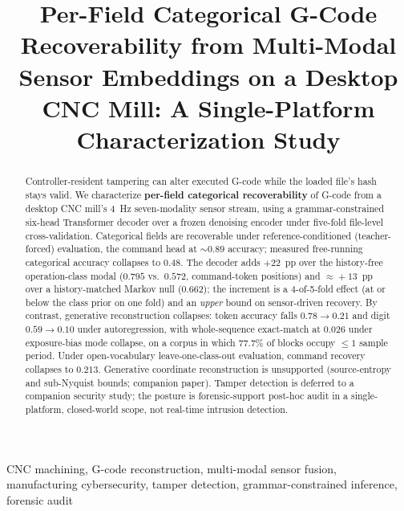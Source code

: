 \documentclass[conference]{IEEEtran}
\begin{document}
\title{Per-Field Categorical G-Code Recoverability from Multi-Modal Sensor Embeddings on a Desktop CNC Mill: A Single-Platform Characterization Study}

\author{%
}

\maketitle

\begin{abstract}
Controller-resident tampering can alter executed G-code while the loaded file's hash stays valid. We characterize \textbf{per-field categorical recoverability} of G-code from a desktop CNC mill's 4~Hz seven-modality sensor stream, using a grammar-constrained six-head Transformer decoder over a frozen denoising encoder under five-fold file-level cross-validation. Categorical fields are recoverable under reference-conditioned (teacher-forced) evaluation, the command head at $\sim\!0.89$ accuracy; measured free-running categorical accuracy collapses to $0.48$. The decoder adds $+22$~pp over the history-free operation-class modal ($0.795$ vs.\ $0.572$, command-token positions) and $\approx\!+13$~pp over a history-matched Markov null ($0.662$); the increment is a 4-of-5-fold effect (at or below the class prior on one fold) and an \emph{upper} bound on sensor-driven recovery. By contrast, generative reconstruction collapses: token accuracy falls $0.78\!\to\!0.21$ and digit $0.59\!\to\!0.10$ under autoregression, with whole-sequence exact-match at $0.026$ under exposure-bias mode collapse, on a corpus in which $77.7\%$ of blocks occupy $\le\!1$ sample period. Under open-vocabulary leave-one-class-out evaluation, command recovery collapses to $0.213$. Generative coordinate reconstruction is unsupported (source-entropy and sub-Nyquist bounds; companion paper). Tamper detection is deferred to a companion security study; the posture is forensic-support post-hoc audit in a single-platform, closed-world scope, not real-time intrusion detection.
\end{abstract}

\begin{IEEEkeywords}
CNC machining, G-code reconstruction, multi-modal sensor fusion, manufacturing cybersecurity, tamper detection, grammar-constrained inference, forensic audit
\end{IEEEkeywords}
\end{document}
